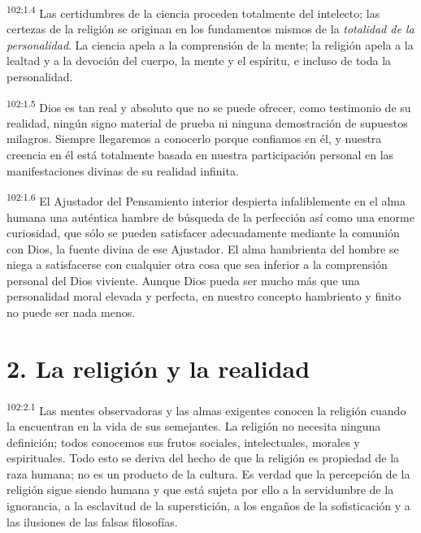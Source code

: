 \par
\textsuperscript{102:1.4} Las certidumbres de la ciencia proceden totalmente del intelecto; las certezas de la religión se originan en los fundamentos mismos de la \textit{totalidad de la personalidad}. La ciencia apela a la comprensión de la mente; la religión apela a la lealtad y a la devoción del cuerpo, la mente y el espíritu, e incluso de toda la personalidad.

\par
\textsuperscript{102:1.5} Dios es tan real y absoluto que no se puede ofrecer, como testimonio de su realidad, ningún signo material de prueba ni ninguna demostración de supuestos milagros. Siempre llegaremos a conocerlo porque confiamos en él, y nuestra creencia en él está totalmente basada en nuestra participación personal en las manifestaciones divinas de su realidad infinita.

\par
\textsuperscript{102:1.6} El Ajustador del Pensamiento interior despierta infaliblemente en el alma humana una auténtica hambre de búsqueda de la perfección así como una enorme curiosidad, que sólo se pueden satisfacer adecuadamente mediante la comunión con Dios, la fuente divina de ese Ajustador. El alma hambrienta del hombre se niega a satisfacerse con cualquier otra cosa que sea inferior a la comprensión personal del Dios viviente. Aunque Dios pueda ser mucho más que una personalidad moral elevada y perfecta, en nuestro concepto hambriento y finito no puede ser nada menos.

\section*{2. La religión y la realidad}
\par
\textsuperscript{102:2.1} Las mentes observadoras y las almas exigentes conocen la religión cuando la encuentran en la vida de sus semejantes. La religión no necesita ninguna definición; todos conocemos sus frutos sociales, intelectuales, morales y espirituales. Todo esto se deriva del hecho de que la religión es propiedad de la raza humana; no es un producto de la cultura. Es verdad que la percepción de la religión sigue siendo humana y que está sujeta por ello a la servidumbre de la ignorancia, a la esclavitud de la superstición, a los engaños de la sofisticación y a las ilusiones de las falsas filosofías.


